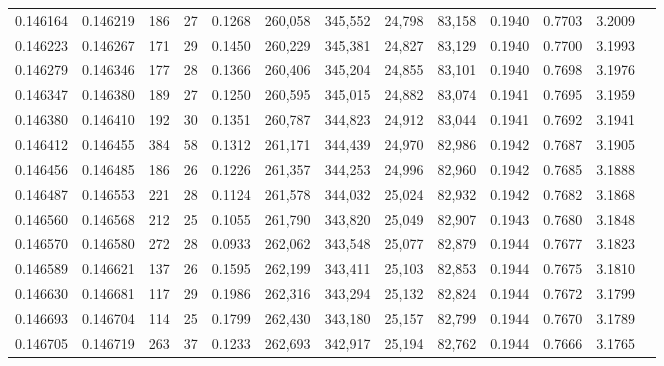 \begin{tabular}{rrrrrrrrrrrrr}
0.146164 & 0.146219 &   186 &  27 &                                     0.1268 & 260,058 & 345,552 &  24,798 &  83,158 & 0.1940 & 0.7703 & 3.2009 \\
0.146223 & 0.146267 &   171 &  29 &                                     0.1450 & 260,229 & 345,381 &  24,827 &  83,129 & 0.1940 & 0.7700 & 3.1993 \\
0.146279 & 0.146346 &   177 &  28 &                                     0.1366 & 260,406 & 345,204 &  24,855 &  83,101 & 0.1940 & 0.7698 & 3.1976 \\
0.146347 & 0.146380 &   189 &  27 &                                     0.1250 & 260,595 & 345,015 &  24,882 &  83,074 & 0.1941 & 0.7695 & 3.1959 \\
0.146380 & 0.146410 &   192 &  30 &                                     0.1351 & 260,787 & 344,823 &  24,912 &  83,044 & 0.1941 & 0.7692 & 3.1941 \\
0.146412 & 0.146455 &   384 &  58 &                                     0.1312 & 261,171 & 344,439 &  24,970 &  82,986 & 0.1942 & 0.7687 & 3.1905 \\
0.146456 & 0.146485 &   186 &  26 &                                     0.1226 & 261,357 & 344,253 &  24,996 &  82,960 & 0.1942 & 0.7685 & 3.1888 \\
0.146487 & 0.146553 &   221 &  28 &                                     0.1124 & 261,578 & 344,032 &  25,024 &  82,932 & 0.1942 & 0.7682 & 3.1868 \\
0.146560 & 0.146568 &   212 &  25 &                                     0.1055 & 261,790 & 343,820 &  25,049 &  82,907 & 0.1943 & 0.7680 & 3.1848 \\
0.146570 & 0.146580 &   272 &  28 &                                     0.0933 & 262,062 & 343,548 &  25,077 &  82,879 & 0.1944 & 0.7677 & 3.1823 \\
0.146589 & 0.146621 &   137 &  26 &                                     0.1595 & 262,199 & 343,411 &  25,103 &  82,853 & 0.1944 & 0.7675 & 3.1810 \\
0.146630 & 0.146681 &   117 &  29 &                                     0.1986 & 262,316 & 343,294 &  25,132 &  82,824 & 0.1944 & 0.7672 & 3.1799 \\
0.146693 & 0.146704 &   114 &  25 &                                     0.1799 & 262,430 & 343,180 &  25,157 &  82,799 & 0.1944 & 0.7670 & 3.1789 \\
0.146705 & 0.146719 &   263 &  37 &                                     0.1233 & 262,693 & 342,917 &  25,194 &  82,762 & 0.1944 & 0.7666 & 3.1765 \\

\end{tabular}
